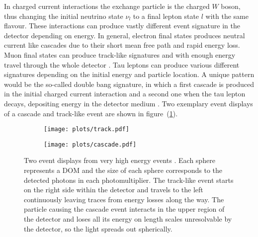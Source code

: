 In charged current interactions the exchange particle is the charged $W$ boson, thus changing the initial neutrino state $\nu_l$ to a final lepton state $l$ with the same flavour.
These interactions can produce vastly different event signature in the detector depending on energy.
In general, electron final states produces neutral current like cascades due to their short mean free path and rapid energy loss.
Muon final states can produce track-like signatures and with enough energy travel through the whole detector .
Tau leptons can produce various different signatures depending on the initial energy and particle location.
A unique pattern would be the so-called double bang signature, in which a first cascade is produced in the initial charged current interaction and a second one when the tau lepton decays, depositing energy in the detector medium .
Two exemplary event displays of a cascade and track-like event are shown in figure~(\ref{fig:icecube_events_topologies}).

\begin{figure}[htbp]
  \centering
  \begin{subfigure}[c]{0.49\textwidth}
    \centering
    \texttt{[image: plots/track.pdf]}
  \end{subfigure}
  \hfill
  \begin{subfigure}[c]{0.49\textwidth}
    \centering
    \texttt{[image: plots/cascade.pdf]}
  \end{subfigure}
  \caption{
    Two event displays from very high energy events .
    Each sphere represents a DOM and the size of each sphere corresponds to the detected photons in each photomultiplier.
    The track-like event starts on the right side within the detector and travels to the left continuously leaving traces from energy losses along the way.
    The particle causing the cascade event interacts in the upper region of the detector and loses all its energy on length scales unresolvable by the detector, so the light spreads out spherically.
  }
  \label{fig:icecube_events_topologies}
\end{figure}

